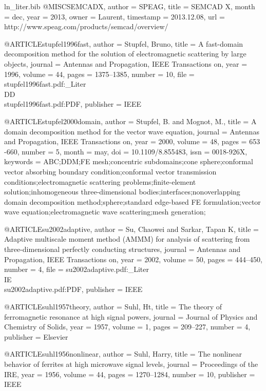 \begin{filecontents*}{ln_liter.bib}
@MISC{SEMCADX,
  author = {SPEAG},
  title = {{SEMCAD X}},
  month = dec,
  year = {2013},
  owner = {Laurent},
  timestamp = {2013.12.08},
  url = {http://www.speag.com/products/semcad/overview/}
}

@ARTICLE{stupfel1996fast,
  author = {Stupfel, Bruno},
  title = {A fast-domain decomposition method for the solution of electromagnetic
	scattering by large objects},
  journal = {Antennas and Propagation, IEEE Transactions on},
  year = {1996},
  volume = {44},
  pages = {1375--1385},
  number = {10},
  file = {stupfel1996fast.pdf:_Liter\\DD\\stupfel1996fast.pdf:PDF},
  publisher = {IEEE}
}

@ARTICLE{stupfel2000domain,
  author = {Stupfel, B. and Mognot, M.},
  title = {A domain decomposition method for the vector wave equation},
  journal = {Antennas and Propagation, IEEE Transactions on},
  year = {2000},
  volume = {48},
  pages = {653 -660},
  number = {5},
  month = {may},
  doi = {10.1109/8.855483},
  issn = {0018-926X},
  keywords = {ABC;DDM;FE mesh;concentric subdomains;cone sphere;conformal vector
	absorbing boundary condition;conformal vector transmission conditions;electromagnetic
	scattering problems;finite-element solution;inhomogeneous three-dimensional
	bodies;interfaces;nonoverlapping domain decomposition method;sphere;standard
	edge-based FE formulation;vector wave equation;electromagnetic wave
	scattering;mesh generation;}
}

@ARTICLE{su2002adaptive,
  author = {Su, Chaowei and Sarkar, Tapan K},
  title = {Adaptive multiscale moment method ({AMMM}) for analysis of scattering
	from three-dimensional perfectly conducting structures},
  journal = {Antennas and Propagation, IEEE Transactions on},
  year = {2002},
  volume = {50},
  pages = {444--450},
  number = {4},
  file = {su2002adaptive.pdf:_Liter\\IE\\su2002adaptive.pdf:PDF},
  publisher = {IEEE}
}

@ARTICLE{suhl1957theory,
  author = {Suhl, Ht},
  title = {The theory of ferromagnetic resonance at high signal powers},
  journal = {Journal of Physics and Chemistry of Solids},
  year = {1957},
  volume = {1},
  pages = {209--227},
  number = {4},
  publisher = {Elsevier}
}

@ARTICLE{suhl1956nonlinear,
  author = {Suhl, Harry},
  title = {The nonlinear behavior of ferrites at high microwave signal levels},
  journal = {Proceedings of the IRE},
  year = {1956},
  volume = {44},
  pages = {1270--1284},
  number = {10},
  publisher = {IEEE}
}


\end{filecontents*}
